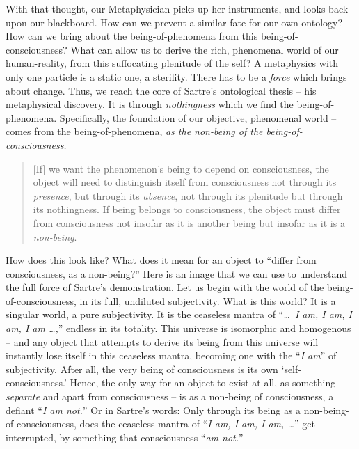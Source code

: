 With that thought, our Metaphysician picks up her instruments, and looks back upon our blackboard. How can we prevent a similar fate for our own ontology? How can we bring about the being-of-phenomena from this being-of-consciousness? What can allow us to derive the rich, phenomenal world of our human-reality, from this suffocating plenitude of the self? A metaphysics with only one particle is a static one, a sterility. There has to be a \emph{force} which brings about change. Thus, we reach the core of Sartre's ontological thesis -- his metaphysical discovery. It is through \emph{nothingness} which we find the being-of-phenomena. Specifically, the foundation of our objective, phenomenal world -- comes from the being-of-phenomena, \emph{as the non-being of the being-of-consciousness.}

\blockcquote[21]{Sartre}{[If] we want the phenomenon's being to depend on consciousness, the object will need to distinguish itself from consciousness not through its \emph{presence}, but through its \emph{absence}, not through its plenitude but through its nothingness. If being belongs to consciousness, the object must differ from consciousness not insofar as it is another being but insofar as it is a \emph{non-being}.}

\noindent
How does this look like? What does it mean for an object to \enquote{differ from consciousness, as a non-being?} Here is an image that we can use to understand the full force of Sartre's demonstration. Let us begin with the world of the being-of-consciousness, in its full, undiluted subjectivity. What is this world? It is a singular world, a pure subjectivity. It is the ceaseless mantra of \enquote{\emph{\ldots\ I am, I am, I am, I am \ldots,}} endless in its totality. This universe is isomorphic and homogenous -- and any object that attempts to derive its being from this universe will instantly lose itself in this ceaseless mantra, becoming one with the \enquote{\emph{I am}} of subjectivity. After all, the very being of consciousness is its own \enquote*{self-consciousness.} Hence, the only way for an object to exist at all, as something \emph{separate} and apart from consciousness -- is as a non-being of consciousness, a defiant \enquote{\emph{I am not.}} Or in Sartre's words:  Only through its being as a non-being-of-consciousness, does the ceaseless mantra of \enquote{\emph{I am, I am, I am, \ldots}} get interrupted, by something that consciousness \enquote{\emph{am not.}}


